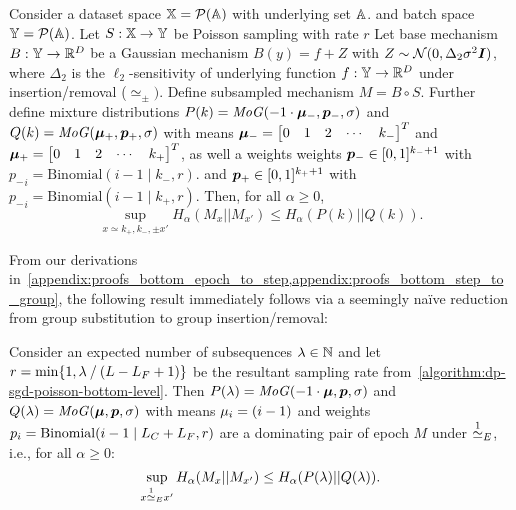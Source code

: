 \begin{lemma}\label{lemma:group_insertion_removal}
    Consider a dataset space ${\mathbb{X}} = \mathcal{P}({\mathbb{A}})$ with underlying set ${\mathbb{A}}$.
    and batch space ${\mathbb{Y}} = \mathcal{P}({\mathbb{A}})$.
    Let $S : {\mathbb{X}} \rightarrow {\mathbb{Y}}$ be Poisson sampling with rate $r$
    Let base mechanism $B : {\mathbb{Y}} \rightarrow {\mathbb{R}}^D$ be a Gaussian mechanism $B(y) = f + Z$ with $Z \sim \mathcal{N}(0,\Delta_2 \sigma^2 {\bm{I}})$, where $\Delta_2$ is the $\ell_2$-sensitivity of underlying function $f : {\mathbb{Y}} \rightarrow {\mathbb{R}}^D$
    under insertion/removal ($\simeq_\pm)$.
    Define subsampled mechanism $M = B \circ S$. 
    Further define mixture distributions 
    ${P}(k) = \mathit{MoG}(-1 \cdot {\bm{\mu}}_-, {\bm{p}}_-, \sigma)$
    and
    ${Q}(k) = \mathit{MoG}({\bm{\mu}}_+, {\bm{p}}_+, \sigma)$
    with
    means ${\bm{\mu}}_- = \begin{bmatrix}
        0 & 1 &  2 & \cdots & k_-
    \end{bmatrix}^T$ 
    and
     ${\bm{\mu}}_+ = \begin{bmatrix}
        0 & 1 &  2 & \cdots & k_+
    \end{bmatrix}^T$,
    as well a weights
    weights ${\bm{p}}_- \in [0,1]^{k_- + 1}$ with ${p_-}_i = \mathrm{Binomial}(i-1 \mid k_-, r)$.
    and
    ${\bm{p}}_+ \in [0,1]^{k_+ + 1}$ with ${p_-}_i = \mathrm{Binomial}(i-1 \mid k_+, r)$.
    Then, for all $\alpha \geq 0$,
    \begin{equation}
        \sup_{x \simeq{k_+, k_-, \pm} x'} H_\alpha(M_x || M_{x'}) \leq  H_\alpha(P(k) || Q(k)).
    \end{equation}
\end{lemma}
From our derivations in~\cref{appendix:proofs_bottom_epoch_to_step,appendix:proofs_bottom_step_to_group}, the following result immediately follows via a seemingly na\"ive  reduction from group substitution to group insertion/removal:
\begin{lemma}\label{lemma:deterministic_top_level_poisson_upper}
    Consider an expected number of subsequences $\lambda \in \mathbb{N}$ and let $r = \min\{1, \lambda \mathbin{/} (L - L_F + 1)\}$ be the resultant sampling rate from~\cref{algorithm:dp-sgd-poisson-bottom-level}.
    Then 
    $P(\lambda) = \mathit{MoG}(-1 \cdot {\bm{\mu}}, {\bm{p}}, \sigma)$ and 
    $Q(\lambda) = \mathit{MoG}({\bm{\mu}}, {\bm{p}}, \sigma)$ with
    means ${\mu}_i = (i - 1)$ and 
    weights ${p}_i = \mathrm{Binomial}(i - 1 \mid L_C + L_F, r)$
    are a dominating pair of epoch $M$ under $\overset{1}{\simeq}_{E}$, i.e., for all $\alpha \geq 0$: 
    \begin{equation}
        \sup_{x \overset{1}{\simeq}_{E} x'} H_\alpha(M_x || M_{x'}) \leq  H_\alpha(P(\lambda) || Q(\lambda)).
    \end{equation}
\end{lemma}
